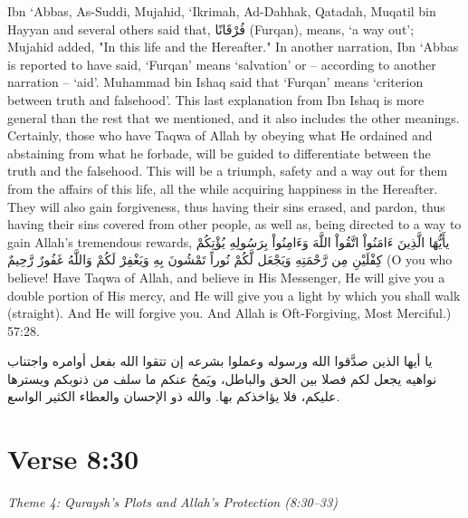 \documentclass[11pt,a4paper,openany]{book}
\let\textAR\textarabic
\begin{document}
\begin{tafsirbox}
Ibn `Abbas, As-Suddi, Mujahid, `Ikrimah, Ad-Dahhak, Qatadah, Muqatil bin Hayyan and several others said that, \textAR{فُرْقَانًا} (Furqan), means, `a way out'; Mujahid added, "In this life and the Hereafter." In another narration, Ibn `Abbas is reported to have said, `Furqan' means `salvation' or -- according to another narration -- `aid'. Muhammad bin Ishaq said that `Furqan' means `criterion between truth and falsehood'. This last explanation from Ibn Ishaq is more general than the rest that we mentioned, and it also includes the other meanings. Certainly, those who have Taqwa of Allah by obeying what He ordained and abstaining from what he forbade, will be guided to differentiate between the truth and the falsehood. This will be a triumph, safety and a way out for them from the affairs of this life, all the while acquiring happiness in the Hereafter. They will also gain forgiveness, thus having their sins erased, and pardon, thus having their sins covered from other people, as well as, being directed to a way to gain Allah's tremendous rewards, \textAR{يأَيُّهَا} \textAR{الَّذِينَ} \textAR{ءَامَنُواْ} \textAR{اتَّقُواْ} \textAR{اللَّهَ} \textAR{وَءَامِنُواْ} \textAR{بِرَسُولِهِ} \textAR{يُؤْتِكُمْ} \textAR{كِفْلَيْنِ} \textAR{مِن} \textAR{رَّحْمَتِهِ} \textAR{وَيَجْعَل} \textAR{لَّكُمْ} \textAR{نُوراً} \textAR{تَمْشُونَ} \textAR{بِهِ} \textAR{وَيَغْفِرْ} \textAR{لَكُمْ} \textAR{وَاللَّهُ} \textAR{غَفُورٌ} \textAR{رَّحِيمٌ} (O you who believe! Have Taqwa of Allah, and believe in His Messenger, He will give you a double portion of His mercy, and He will give you a light by which you shall walk (straight). And He will forgive you. And Allah is Oft-Forgiving, Most Merciful.) 57:28.
\end{tafsirbox}


\begin{muyassarbox}
\textAR{يا أيها الذين صدَّقوا الله ورسوله وعملوا بشرعه إن تتقوا الله بفعل أوامره واجتناب نواهيه يجعل لكم فصلا بين الحق والباطل، ويَمحُ عنكم ما سلف من ذنوبكم ويسترها عليكم، فلا يؤاخذكم بها. والله ذو الإحسان والعطاء الكثير الواسع.}
\end{muyassarbox}


\newpage

\section{Verse 8:30}
{\small\color{accent2}\itshape Theme 4: Quraysh's Plots and Allah's Protection (8:30--33)}
\end{document}
